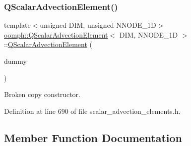 \subsubsection{\texorpdfstring{Q\+Scalar\+Advection\+Element()}{QScalarAdvectionElement()}\hspace{0.1cm}{\footnotesize\ttfamily [2/2]}}
{\footnotesize\ttfamily template$<$unsigned D\+IM, unsigned N\+N\+O\+D\+E\+\_\+1D$>$ \\
\hyperlink{classoomph_1_1QScalarAdvectionElement}{oomph\+::\+Q\+Scalar\+Advection\+Element}$<$ D\+IM, N\+N\+O\+D\+E\+\_\+1D $>$\+::\hyperlink{classoomph_1_1QScalarAdvectionElement}{Q\+Scalar\+Advection\+Element} (\begin{DoxyParamCaption}\item[{const \hyperlink{classoomph_1_1QScalarAdvectionElement}{Q\+Scalar\+Advection\+Element}$<$ D\+IM, N\+N\+O\+D\+E\+\_\+1D $>$ \&}]{dummy }\end{DoxyParamCaption})\hspace{0.3cm}{\ttfamily [inline]}}



Broken copy constructor. 



Definition at line 690 of file scalar\+\_\+advection\+\_\+elements.\+h.



\subsection{Member Function Documentation}
\mbox{\label{classoomph_1_1QScalarAdvectionElement_aa7d957edda208be9ab56322dc735fda7}} 
